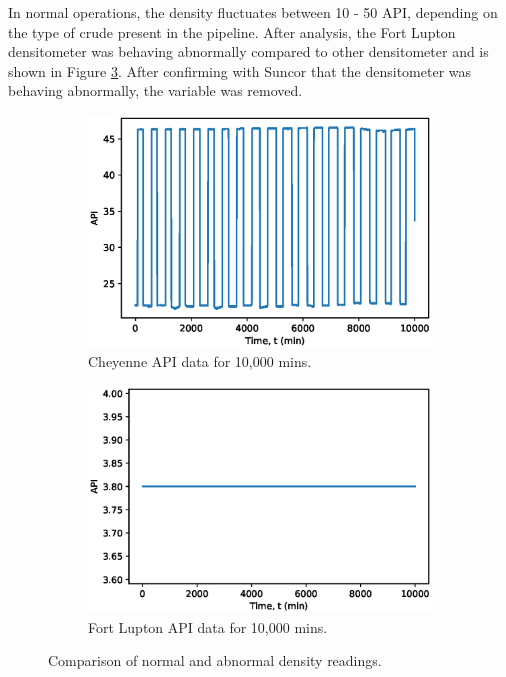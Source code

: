 In normal operations, the density fluctuates between 10 - 50 API, depending on the type of crude present in the pipeline.  After analysis, the Fort Lupton densitometer was behaving abnormally compared to other densitometer and is shown in Figure \ref{fig:08Density}.  After confirming with Suncor that the densitometer was behaving abnormally, the variable was removed.  
\begin{figure}[h]
     \centering
     \begin{subfigure}[b]{0.48\textwidth}
         \centering
         \includegraphics[width=\textwidth]{images/08CheyDensity.eps}
         \caption{Cheyenne API data for 10,000 mins.}
         \label{fig:08GoodDensity}
     \end{subfigure}
     \hfill
     \begin{subfigure}[b]{0.48\textwidth}
         \centering
         \includegraphics[width=\textwidth]{images/08FLDensity.eps}
         \caption{Fort Lupton API data for 10,000 mins.}
         \label{fig:08BadDensity}
     \end{subfigure}
        \caption{Comparison of normal and abnormal density readings.}
        \label{fig:08Density}
\end{figure}

